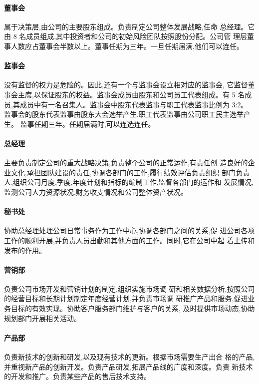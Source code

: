 \paragraph{董事会}
属于决策层,由公司的主要股东组成。负责制定公司整体发展战略,任命
总经理。它由 8 名成员组成,其中投资者和公司的初始风险团队按照股份分配。公司管
理层董事人数应占董事会半数以上。董事任期为三年。一旦任期届满,他们可以连任。

\paragraph{监事会}
没有监督的权力是危险的。因此,还有一个与监事会设立相对应的监事会,
它监督董事会主席,以保证股东的权益。监事会成员由股东和公司员工代表组成。有 5
名成员,其成员中有一名召集人。监事会中股东代表监事与职工代表监事比例为 3:2。
监事会的股东代表监事由股东大会选举产生,职工代表监事由公司职工民主选举产生。
监事任期三年。任期届满时,可以连选连任。

\paragraph{总经理}
主要负责制定公司的重大战略决策,负责整个公司的正常运作,有责任创
造良好的企业文化,承担团队建设的责任,协调各部门的工作,履行绩效评估负责组织
部门负责人,组织公司月度,季度,年度计划和指标的编制工作,监督各部门的运作和
发展情况,监测公司人力资源状况,财务收支情况和公司整体资产状况。

\paragraph{秘书处}
协助总经理处理公司日常事务作为工作中心,协调各部门之间的关系,促
进公司各项工作的顺利开展,并负责人员出勤和其他方面的工作。同时,它在公司中起
着上传和发布的作用。

\paragraph{营销部}
负责公司市场开发和营销计划的制定,组织实施市场调
研和相关数据分析,按照公司的经营目标和长期计划制定年度经营计划,并负责市场调
研推广产品和服务,促进业务目标的有效实现。协助客户服务部门维护与客户的关系,
及时提供市场动态,协助规划部门开展相关活动。

\paragraph{产品部}
负责新技术的创新和研发,以及现有技术的更新。根据市场需要生产出合
格的产品,并重视新产品的创新开发。负责产品研发,拓展产品线的广度和深度。负责
新技术的开发和推广。负责某些产品的售后技术支持。

